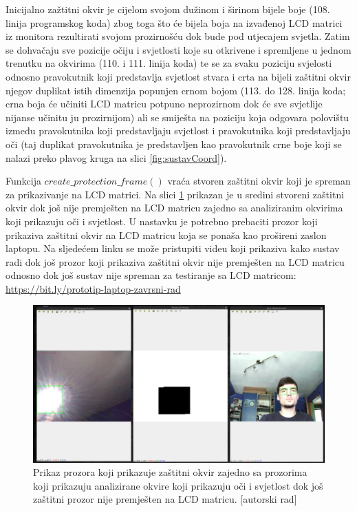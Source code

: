 \documentclass{foi}
\begin{document}
Inicijalno zažtitni okvir je cijelom svojom dužinom i širinom bijele boje (108. linija programskog koda) zbog toga što će bijela boja na izvađenoj LCD matrici iz monitora rezultirati svojom prozirnošću dok bude pod utjecajem svjetla. Zatim se dohvačaju sve pozicije očiju i svjetlosti koje su otkrivene i spremljene u jednom trenutku na okvirima (110. i 111. linija koda) te se za svaku poziciju svjelosti odnosno pravokutnik koji predstavlja svjetlost stvara i crta na bijeli zaštitni okvir njegov duplikat istih dimenzija popunjen crnom bojom (113. do 128. linija koda; crna boja će učiniti LCD matricu potpuno neprozirnom dok će sve svjetlije nijanse učinitu ju prozirnijom) ali se smiješta na poziciju koja odgovara polovištu između pravokutnika koji predstavljaju svjetlost i pravokutnika koji predstavljaju oči (taj duplikat pravokutnika je predstavljen kao pravokutnik crne boje koji se nalazi preko plavog kruga na slici \ref{fig:sustavCoord}).

Funkcija $create\_protection\_frame()$ vraća stvoren zaštitni okvir koji je spreman za prikazivanje na LCD matrici. Na slici \ref{fig:zastitni_okvir} prikazan je u sredini stvoreni zaštitni okvir dok još nije premješten na LCD matricu zajedno sa analiziranim okvirima koji prikazuju oči i svjetlost. U nastavku je potrebno prebaciti prozor koji prikaziva zaštitni okvir na LCD matricu koja se ponaša kao prošireni zaslon laptopu. Na sljedećem linku se može pristupiti videu koji prikaziva kako sustav radi dok još prozor koji prikaziva zaštitni okvir nije premješten na LCD matricu odnosno dok još sustav nije spreman za testiranje sa LCD matricom: \url{https://bit.ly/prototip-laptop-zavrsni-rad}

\begin{figure}[h!]
    \centering
    \includegraphics[width=1\textwidth]{slike/zastitni_okvir}
    \caption{Prikaz prozora koji prikazuje zaštitni okvir zajedno sa prozorima koji prikazuju analizirane okvire koji prikazuju oči i svjetlost dok još zaštitni prozor nije premješten na LCD matricu. [autorski rad]}
    \label{fig:zastitni_okvir}
\end{figure}
\end{document}
